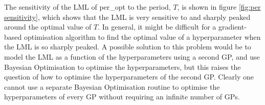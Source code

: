 The sensitivity of the LML of per\_opt to the period, $T$, is shown in figure \ref{fig:per sensitivity}, which shows that the LML is very sensitive to and sharply peaked around the optimal value of $T$. In general, it might be difficult for a gradient-based optimisation algorithm to find the optimal value of a hyperparameter when the LML is so sharply peaked. A possible solution to this problem would be to model the LML as a function of the hyperparameters using a second GP, and use Bayesian Optimisation \cite{snoek2012practical} to optimise the hyperparameters, but this raises the question of how to optimise the hyperparameters of the second GP. Clearly one cannot use a separate Bayesian Optimisation routine to optimise the hyperparameters of every GP without requiring an infinite number of GPs.
